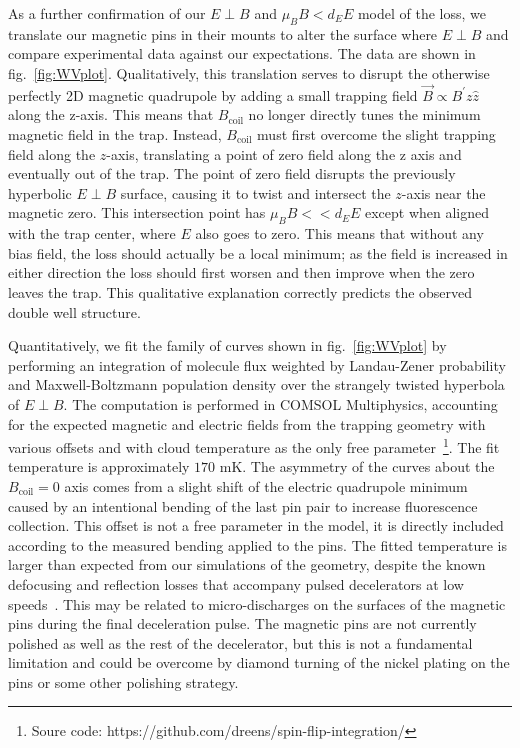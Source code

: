 \documentclass[%
 reprint,
groupedaddress,
 amsmath,amssymb,
 aps,
prl,
]{revtex4-1}
\newcommand{\epb}{$E\!\perp\!B$}
\begin{document}
As a further confirmation of our \epb{}  and $\mu_BB<d_EE$ model of the loss, we translate our magnetic pins in their mounts to alter the surface where \epb{}  and compare experimental data against our expectations. The data are shown in fig.~\ref{fig:WVplot}. Qualitatively, this translation serves to disrupt the otherwise perfectly 2D magnetic quadrupole by adding a small trapping field $\vec{B}\propto B^\prime z\hat{z}$ along the z-axis. This means that $B_\text{coil}$ no longer directly tunes the minimum magnetic field in the trap. Instead, $B_\text{coil}$ must first overcome the slight trapping field along the $z$-axis, translating a point of zero field along the z axis and eventually out of the trap. The point of zero field disrupts the previously hyperbolic \epb{} surface, causing it to twist and intersect the $z$-axis near the magnetic zero. This intersection point has $\mu_BB<< d_EE$ except when aligned with the trap center, where $E$ also goes to zero. This means that without any bias field, the loss should actually be a local minimum; as the field is increased in either direction the loss should first worsen and then improve when the zero leaves the trap. This qualitative explanation correctly predicts the observed double well structure.

Quantitatively, we fit the family of curves shown in fig.~\ref{fig:WVplot} by performing an integration of molecule flux weighted by Landau-Zener probability and Maxwell-Boltzmann population density over the strangely twisted hyperbola of \epb. The computation is performed in COMSOL Multiphysics, accounting for the expected magnetic and electric fields from the trapping geometry with various offsets and with cloud temperature as the only free parameter~\footnote{Soure code: https://github.com/dreens/spin-flip-integration/}. The fit temperature is approximately $170\text{ mK}$. The asymmetry of the curves about the $B_\text{coil}=0$ axis comes from a slight shift of the electric quadrupole minimum caused by an intentional bending of the last pin pair to increase fluorescence collection. This offset is not a free parameter in the model, it is directly included according to the measured bending applied to the pins. The fitted temperature is larger than expected from our simulations of the geometry, despite the known defocusing and reflection losses that accompany pulsed decelerators at low speeds~\cite{Sawyer2008a}. This may be related to micro-discharges on the surfaces of the magnetic pins during the final deceleration pulse. The magnetic pins are not currently polished as well as the rest of the decelerator, but this is not a fundamental limitation and could be overcome by diamond turning of the nickel plating on the pins or some other polishing strategy.
\end{document}
